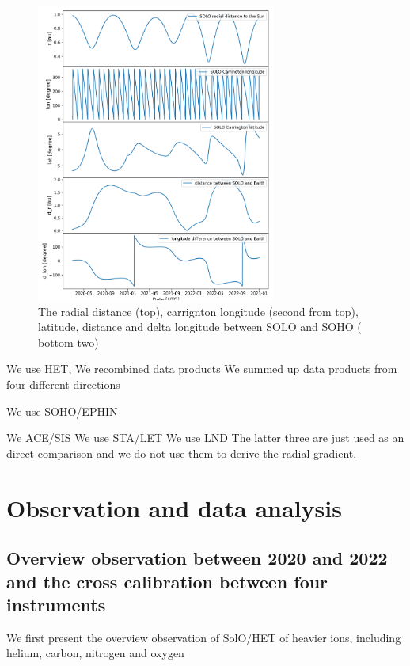 \begin{figure}
    \centering
    \includegraphics[width = 0.7\textwidth]{images/ACR/SOLO_orbit_helioscentric_2.png}
    \caption{The radial distance (top), carrignton longitude (second from top), latitude, distance and delta longitude between SOLO and SOHO ( bottom two)}
    \label{fig:SOLO_orbit_2}
\end{figure}

We use HET,
We recombined data products
We summed up data products from four different directions

We use SOHO/EPHIN

We ACE/SIS
We use STA/LET
We use LND
The latter three are just used as an direct comparison and  we do not use them to derive the radial gradient.

\section{Observation and data analysis}

\subsection{Overview observation between 2020 and 2022 and the cross calibration between four instruments}


We first present the overview observation of \ac{SolO}/\ac{HET} of heavier ions, including helium, carbon, nitrogen and oxygen


